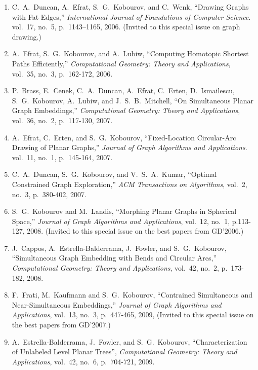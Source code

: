 \documentclass[10pt]{article}
\begin{document}
\begin{description}
\begin{enumerate}
\item \label{fatedges}
C.~A.~Duncan, A.~Efrat, S.~G.~Kobourov, and C.~Wenk, ``Drawing Graphs
with Fat Edges,'' {\em International Journal of Foundations of Computer Science}. vol.~17, no.~5, p.~1143--1165, 2006. (Invited to this special issue on graph drawing.)


\item \label{homotopy}
A.~Efrat, S.~G.~Kobourov, and A.~Lubiw, ``Computing Homotopic Shortest
Paths Efficiently,'' {\em Computational Geometry: Theory and Applications}, vol.~35, no.~3, p.~162-172, 2006.

\item \label{wads}
P.~Brass, E.~Cenek, C.~A.~Duncan, A.~Efrat, C.~Erten, D.~Ismailescu,
S.~G.~Kobourov, A.~Lubiw, and J.~S.~B.~Mitchell, ``On Simultaneous
Planar Graph Embeddings,'' {\em Computational Geometry: Theory and Applications}, vol.~36, no.~2, p.~117-130, 2007.

\item \label{2CD3CD}
A.~Efrat, C.~Erten, and S.~G.~Kobourov, ``Fixed-Location Circular-Arc
Drawing of Planar Graphs,'' {\em Journal of Graph
Algorithms and Applications}. vol.~11, no.~1, p.~145-164, 2007.

\item \label{ocge}
 C.~A.~Duncan, S.~G.~Kobourov, and V.~S.~A.~Kumar, ``Optimal
Constrained Graph Exploration,'' {\em ACM Transactions on Algorithms}, vol.~2, no.~3, p.~380-402, 2007.

\item \label{mpgse}
S.~G.~Kobourov and M.~Landis, ``Morphing Planar Graphs in Spherical Space,'' {\em Journal of Graph Algorithms and Applications}, vol.~12, no.~1, p.113-127, 2008. (Invited to this special issue on the best papers from GD'2006.)

\item \label{sgebce}
J.~Cappos, A.~Estrella-Balderrama, J.~Fowler, and S.~G.~Kobourov, ``Simultaneous Graph Embedding with Bends and Circular Arcs,'' {\em Computational Geometry: Theory and Applications}, vol.~42, no.~2, p.~173-182, 2008.


\item \label{csnse}
F.~Frati, M.~Kaufmann and S.~G.~Kobourov, ``Contrained Simultaneous and Near-Simultaneous Embeddings,'' {\em Journal of Graph Algorithms and Applications}, vol.~13, no.~3, p.~447-465, 2009, (Invited to this special issue on the best papers from GD'2007.)


\item \label{ulpt} A.~Estrella-Balderrama, J.~Fowler, and S.~G.~Kobourov, ``Characterization of Unlabeled Level Planar Trees'',  {\em Computational Geometry: Theory and Applications}, vol.~42, no.~6, p.~704-721, 2009.


\end{enumerate}
\end{description}
\end{document}
